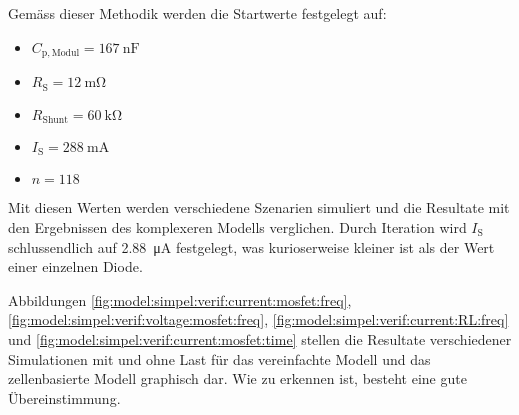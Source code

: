 Gem\"ass dieser Methodik werden die Startwerte festgelegt auf:

\begin{itemize}
    \firmlist
    \item
        $C_{\mathrm{p, Modul}} = \SI{167}{\nano\farad}$
    \item
        $R_{\mathrm{S}} = \SI{12}{\milli\ohm}$
    \item
        $R_{\mathrm{Shunt}} = \SI{60}{\kilo\ohm}$
    \item
        $I_{\mathrm{S}} = \SI{288}{\milli\ampere}$
    \item
        $n = 118$
\end{itemize}

Mit diesen  Werten werden verschiedene  Szenarien simuliert und  die Resultate
mit den  Ergebnissen des komplexeren Modells  verglichen. Durch Iteration wird
$I_{\mathrm{S}}$ schlussendlich  auf \SI{2.88}{\micro\ampere}  festgelegt, was
kurioserweise kleiner ist als der Wert einer einzelnen Diode.

Abbildungen
\ref{fig:model:simpel:verif:current:mosfet:freq},
\ref{fig:model:simpel:verif:voltage:mosfet:freq},
\ref{fig:model:simpel:verif:current:RL:freq} und
\ref{fig:model:simpel:verif:current:mosfet:time} stellen die Resultate
verschiedener Simulationen mit und ohne Last f\"ur das vereinfachte Modell und
das zellenbasierte  Modell graphisch dar.   Wie zu erkennen ist,  besteht eine
gute \"Ubereinstimmung.



